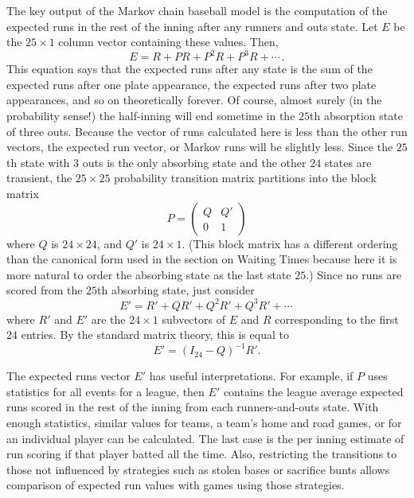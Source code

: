\documentclass[12pt]{article}
\begin{document}
The key output of the Markov chain baseball model is the computation of
the expected runs in the rest of the inning after any runners and outs
state.  Let \( E \) be the \( 25 \times 1 \) column vector containing
these values.  Then,
\[
    E = R + P R + P^2 R + P^3 R + \cdots\,.
\] This equation says that the expected runs after any state is the sum
of the expected runs after one plate appearance, the expected runs after
two plate appearances, and so on theoretically forever.  Of course,
almost surely (in the probability sense!) the half-inning will end
sometime in the \( 25 \)th absorption state of three outs.  Because the
vector of runs calculated here is less than the other run vectors, the
expected run vector, or Markov runs will be slightly less.  Since the \(
25 \)th state with \( 3 \) outs is the only absorbing state and the
other \( 24 \) states are transient, the \( 25 \times 25 \) probability
transition matrix partitions into the block matrix
\[
    P =
    \begin{pmatrix}
        Q       & Q' \\
        0       & 1
    \end{pmatrix}
\] where \( Q \) is \( 24 \times 24 \), and \( Q' \) is \( 24 \times 1 \).
(This block matrix has a different ordering than the canonical form used
in the section on Waiting Times because here it is more natural to order
the absorbing state as the last state \( 25 \).) Since no runs are
scored from the \( 25 \)th absorbing state, just consider
\[
    E' = R' + Q R' + Q^2 R' + Q^3 R' + \cdots\,
\] where \( R' \) and \( E' \) are the \( 24 \times 1 \) subvectors of \(
E \) and \( R \) corresponding to the first 24 entries.  By the standard
matrix theory, this is equal to
\[
    E' = ( I_{24} - Q )^{-1} R'.
\]

The expected runs vector \( E' \) has useful interpretations.  For
example, if \( P \) uses statistics for all events for a league, then \(
E' \) contains the league average expected runs scored in the rest of
the inning from each runners-and-outs state.  With enough statistics,
similar values for teams, a team's home and road games, or for an
individual player can be calculated.  The last case is the per inning
estimate of run scoring if that player batted all the time.  Also,
restricting the transitions to those not influenced by strategies such
as stolen bases or sacrifice bunts allows comparison of expected run
values with games using those strategies.
\end{document}
